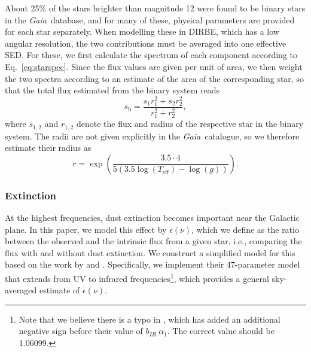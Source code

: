 \documentclass{aa}
\def\GAIA{\textit{Gaia}}
\def\Gaia{\textit{Gaia}}
\begin{document}
About 25\% of the stars brighter than magnitude 12 were found to be binary stars in the \Gaia\ database, and for many of these, physical parameters are provided for each star separately. When modelling these in DIRBE, which has a low angular resolution, the two contributions must be averaged into one effective SED. For these, we first calculate the spectrum of each component according to Eq.~\ref{eq:starspec}. Since the flux values are given per unit of area, we then weight the two spectra according to an estimate of the area of the corresponding star, so that the total flux estimated from the binary system reads
\begin{equation}
    s_{\mathrm{b}} = \frac{s_1 r_1^2+ s_2 r_2^2}{r_1^2 + r_2^2},
\end{equation}
where $s_{1, 2}$ and $r_{1, 2}$ denote the flux and radius of the respective star in the binary system. The radii are not given explicitly in the \GAIA\ catalogue, so we therefore estimate their radius as \citep{kuiper_1938}
\begin{equation}
r = \exp\left(\frac{3.5\cdot 4}{5(3.5 \log(T_{\mathrm{eff}}) - \log(g))}\right ).
\end{equation}

\subsubsection{Extinction}
\label{sec:extinction_model}

At the highest frequencies, dust extinction becomes important near the Galactic plane. In this paper, we model this effect by $\epsilon(\nu)$, which we define as the ratio between the observed and the intrinsic flux from a given star, i.e., comparing the flux with and without dust extinction. We construct a simplified model for this based on the work by \cite{ext_model} and \cite{fitzpatric_19}. Specifically, we implement their 47-parameter model that extends from UV to infrared frequencies\footnote{Note that we believe there is a typo in \cite{ext_model}, which has added an additional negative sign before their value of $b_{IR}\ \alpha_{1}$. The correct value should be 1.06099.}, which provides a general sky-averaged estimate of $\epsilon(\nu)$. 
\end{document}
